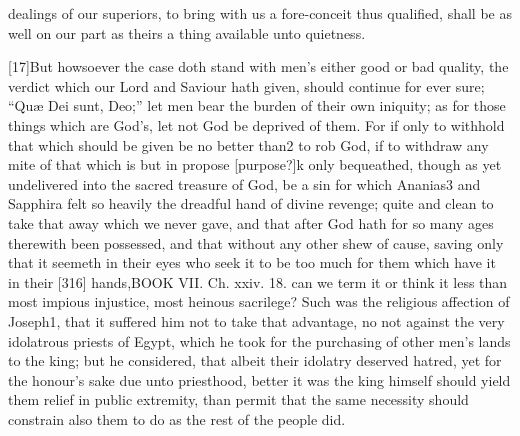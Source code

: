 dealings of our superiors, to bring with us a fore-conceit thus qualified, shall be as well on our part as theirs a thing available unto quietness.

[17]But howsoever the case doth stand with men’s either good or bad quality, the verdict which our Lord and Saviour hath given, should continue for ever sure; “Quæ Dei sunt, Deo;” let men bear the burden of their own iniquity; as for those things which are God’s, let not God be deprived of them. For if only to withhold that which should be given be no better than2 to rob God, if to withdraw any mite of that which is but in propose [purpose?]k only bequeathed, though as yet undelivered into the sacred treasure of God, be a sin for which Ananias3 and Sapphira felt so heavily the dreadful hand of divine revenge; quite and clean to take that away which we never gave, and that after God hath for so many ages therewith been possessed, and that without any other shew of cause, saving only that it seemeth in their eyes who seek it to be too much for them which have it in their [316] hands,BOOK VII. Ch. xxiv. 18. can we term it or think it less than most impious injustice, most heinous sacrilege? Such was the religious affection of Joseph1, that it suffered him not to take that advantage, no not against the very idolatrous priests of Egypt, which he took for the purchasing of other men’s lands to the king; but he considered, that albeit their idolatry deserved hatred, yet for the honour’s sake due unto priesthood, better it was the king himself should yield them relief in public extremity, than permit that the same necessity should constrain also them to do as the rest of the people did.


